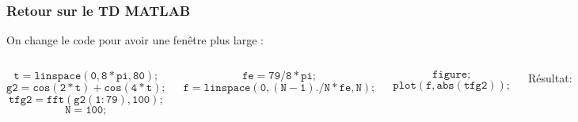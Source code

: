 \documentclass{beamer}
\begin{document}
\begin{frame}
\frametitle{Retour sur le TD MATLAB}
\small On change le code pour avoir une fenêtre plus large :\\
\vspace{0.1cm}
\begin{columns}

\column{60mm}
\[\mathtt{t = linspace(0,8*pi,80);}\]
\[\mathtt{g2 = cos(2*t)+cos(4*t);}\]
\[\mathtt{tfg2 = fft(g2(1:79),100);}\]
\[\mathtt{N = 100;}\]

\[\mathtt{fe = 79/8*pi;}\]
\[\mathtt{f = linspace(0,(N-1)./N*fe,N);}\]

\[\mathtt{figure;} \]
\[\mathtt{plot(f,abs(tfg2));}\]

\column{60mm}
Résultat:\\
\vspace{0.2cm}
\begin{center}
\end{center}

\end{columns}
\end{frame}
\end{document}
